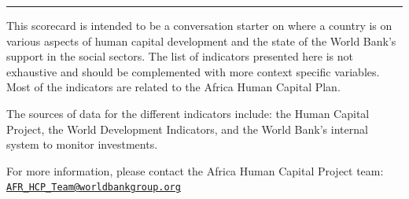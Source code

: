 \documentclass[9.2pt,twocolumn]{article}
\begin{document}
\vspace{-3mm}

\noindent

\rule{9cm}{0.4pt}

This scorecard is intended to be a conversation starter on where a
country is on various aspects of human capital development and the state
of the World Bank's support in the social sectors. The list of
indicators presented here is not exhaustive and should be complemented
with more context specific variables. Most of the indicators are related
to the Africa Human Capital Plan. ~

The sources of data for the different indicators include: the Human
Capital Project, the World Development Indicators, and the World Bank's
internal system to monitor investments. ~

For more information, please contact the Africa Human Capital Project
team:
\href{mailto:AFR_HCP_Team@worldbankgroup.org}{\nolinkurl{AFR\_HCP\_Team@worldbankgroup.org}}
\end{document}
